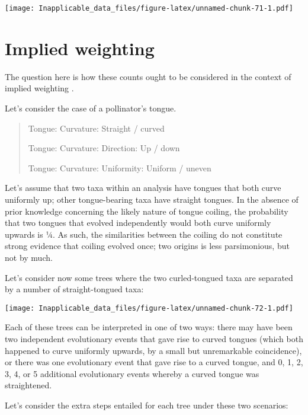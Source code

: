 \documentclass[]{book}
\theoremstyle{definition}
\theoremstyle{definition}
\theoremstyle{definition}
\theoremstyle{remark}
\begin{document}
\texttt{[image: Inapplicable\_data\_files/figure-latex/unnamed-chunk-71-1.pdf]}

\hypertarget{implied-weighting}{%
\section{Implied weighting}\label{implied-weighting}}

The question here is how these counts ought to be considered in the
context of implied weighting \citep{Goloboff1993, Goloboff2014}.

Let's consider the case of a pollinator's tongue.

\begin{quote}
Tongue: Curvature: Straight / curved

Tongue: Curvature: Direction: Up / down

Tongue: Curvature: Uniformity: Uniform / uneven
\end{quote}

Let's assume that two taxa within an analysis have tongues that both
curve uniformly up; other tongue-bearing taxa have straight tongues. In
the absence of prior knowledge concerning the likely nature of tongue
coiling, the probability that two tongues that evolved independently
would both curve uniformly upwards is ¼. As such, the similarities
between the coiling do not constitute strong evidence that coiling
evolved once; two origins is less parsimonious, but not by much.

Let's consider now some trees where the two curled-tongued taxa are
separated by a number of straight-tongued taxa:

\texttt{[image: Inapplicable\_data\_files/figure-latex/unnamed-chunk-72-1.pdf]}

Each of these trees can be interpreted in one of two ways: there may
have been two independent evolutionary events that gave rise to curved
tongues (which both happened to curve uniformly upwards, by a small but
unremarkable coincidence), or there was one evolutionary event that gave
rise to a curved tongue, and 0, 1, 2, 3, 4, or 5 additional evolutionary
events whereby a curved tongue was straightened.

Let's consider the extra steps entailed for each tree under these two
scenarios:
\end{document}
